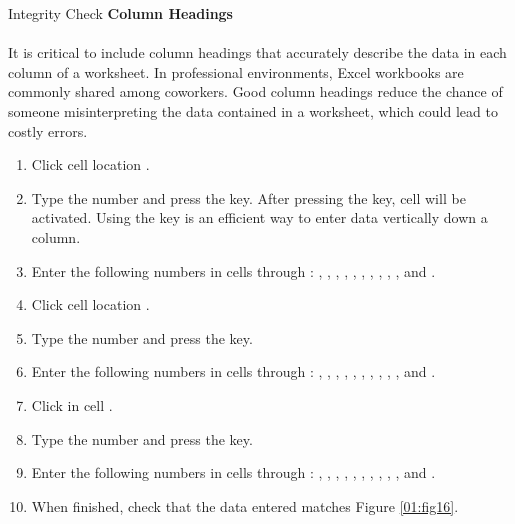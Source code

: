 \begin{center}
	\begin{infobox}{Integrity Check}
		\textbf{Column Headings}
		\\
		\\
		It is critical to include column headings that accurately describe the data in each column of a worksheet. In professional environments, Excel workbooks are commonly shared among coworkers. Good column headings reduce the chance of someone misinterpreting the data contained in a worksheet, which could lead to costly errors.
	\end{infobox}
\end{center}

\begin{enumerate}
	\item Click cell location .
	\item Type the number  and press the  key. After pressing the  key, cell  will be activated. Using the  key is an efficient way to enter data vertically down a column.
	\item Enter the following numbers in cells  through : , , , , , , , , , , and .
	\item Click cell location .
	\item Type the number  and press the  key.
	\item Enter the following numbers in cells  through : , , , , , , , , , , and .
	\item Click in cell .
	\item Type the number  and press the  key.
	\item Enter the following numbers in cells  through : , , , , , , , , , , and .
	\item When finished, check that the data entered matches Figure \ref{01:fig16}.
\end{enumerate}

